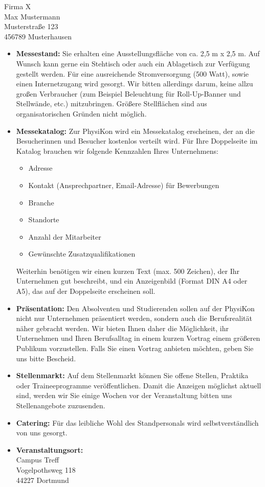 \documentclass[
  pepbrief,
  fontsize=12pt,
  paper=a4,
  DIV=14,
  parskip=half,
  backaddress=false,
]{scrlttr2}
\begin{document}
\begin{letter}{%
  Firma X\\
  Max Mustermann\\
  Musterstraße 123\\
  456789 Musterhausen

}
\begin{itemize}
  \item \textbf{Messestand:} Sie erhalten eine Ausstellungsfläche von ca. 2,5 m x 2,5 m.
    Auf Wunsch kann gerne ein Stehtisch oder auch ein Ablagetisch zur Verfügung gestellt werden.
    Für eine ausreichende Stromversorgung (500 Watt), sowie einen Internetzugang wird gesorgt.
    Wir bitten allerdings darum, keine allzu großen Verbraucher (zum Beispiel Beleuchtung für Roll-Up-Banner und Stellwände, etc.) mitzubringen.
    Größere Stellflächen sind aus organisatorischen Gründen nicht möglich.
    \item \textbf{Messekatalog:} Zur PhysiKon wird ein Messekatalog erscheinen, der an die Besucherinnen und Besucher kostenlos verteilt wird.
    Für Ihre Doppelseite im Katalog brauchen wir folgende Kennzahlen Ihres Unternehmens:
    \begin{itemize}
      \item Adresse
      \item Kontakt (Ansprechpartner, Email-Adresse) für Bewerbungen
      \item Branche
      \item Standorte
      \item Anzahl der Mitarbeiter
      \item Gewünschte Zusatzqualifikationen
    \end{itemize}
    Weiterhin benötigen wir einen kurzen Text (max. 500 Zeichen), der Ihr Unternehmen gut beschreibt, und ein Anzeigenbild (Format DIN A4 oder A5), das auf der Doppelseite erscheinen soll.
    \item \textbf{Präsentation:} Den Absolventen und Studierenden sollen auf der PhysiKon nicht nur Unternehmen präsentiert werden, sondern auch die Berufsrealität näher gebracht werden.
    Wir bieten Ihnen daher die Möglichkeit, ihr Unternehmen und Ihren Berufsalltag in einem kurzen Vortrag einem größeren Publikum vorzustellen.
    Falls Sie einen Vortrag anbieten möchten, geben Sie uns bitte Bescheid.
    \item \textbf{Stellenmarkt:} Auf dem Stellenmarkt können Sie offene Stellen, Praktika oder Traineeprogramme veröffentlichen. Damit die Anzeigen möglichst aktuell sind,
    werden wir Sie einige Wochen vor der Veranstaltung bitten uns Stellenangebote zuzusenden.
    \item \textbf{Catering:} Für das leibliche Wohl des Standpersonals wird selbstverständlich von uns gesorgt.
    \item \textbf{Veranstaltungsort:}
    \vspace{3mm}\\
    Campus Treff\\
    Vogelpothsweg 118\\
    44227 Dortmund
\end{itemize}


\end{letter}
\end{document}
